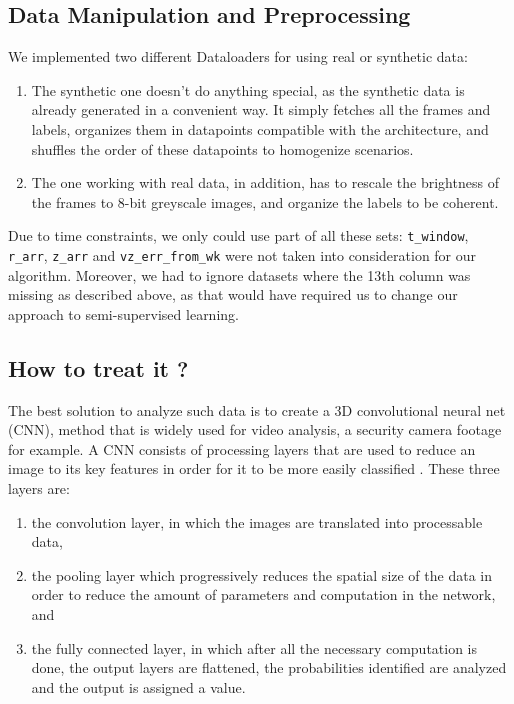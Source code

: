 \documentclass[10pt,conference]{IEEEtran}
\begin{document}
\subsection{Data Manipulation and Preprocessing}
We implemented two different Dataloaders for using real or synthetic data: 
\begin{enumerate}
  \item The synthetic one doesn't do anything special, as the synthetic data is already generated in a convenient way. It simply fetches all the frames and labels, organizes them in datapoints compatible with the architecture, and shuffles the order of these datapoints to homogenize scenarios.
  \item The one working with real data, in addition, has to rescale the brightness of the frames to 8-bit greyscale images, and organize the labels to be coherent.
\end{enumerate}
Due to time constraints, we only could use part of all these sets: \texttt{t\_window}, \texttt{r\_arr}, \texttt{z\_arr} and \texttt{vz\_err\_from\_wk} were not taken into consideration for our algorithm. Moreover, we had to ignore datasets where the 13th column was missing as described above, as that would have required us to change our approach to semi-supervised learning.

\subsection{How to treat it ?}
The best solution to analyze such data is to create a 3D convolutional neural net (CNN), method that is widely used for video analysis, a security camera footage for example. A CNN consists of processing layers that are used to reduce an image to its key features in order for it to be more easily classified \cite{velocitycnn}. These three layers are:
\begin{enumerate}
  \item the convolution layer, in which the images are translated into processable data,
  \item the pooling layer which progressively reduces the spatial size of the data in order to reduce the amount of parameters and computation in the network, and
  \item the fully connected layer, in which after all the necessary computation is done, the output layers are flattened, the probabilities identified are analyzed and the output is assigned a value.
\end{enumerate}
\end{document}
